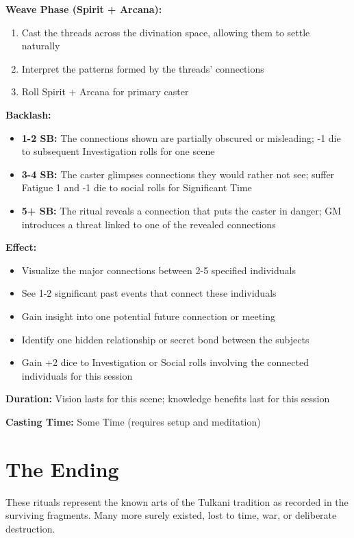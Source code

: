 \textbf{Weave Phase (Spirit + Arcana):}
\begin{enumerate}
\item Cast the threads across the divination space, allowing them to settle naturally
\item Interpret the patterns formed by the threads' connections
\item Roll Spirit + Arcana for primary caster
\end{enumerate}

\textbf{Backlash:}
\begin{itemize}
\item \textbf{1-2 SB:} The connections shown are partially obscured or misleading; -1 die to subsequent Investigation rolls for one scene
\item \textbf{3-4 SB:} The caster glimpses connections they would rather not see; suffer Fatigue 1 and -1 die to social rolls for Significant Time
\item \textbf{5+ SB:} The ritual reveals a connection that puts the caster in danger; GM introduces a threat linked to one of the revealed connections
\end{itemize}

\textbf{Effect:}
\begin{itemize}
\item Visualize the major connections between 2-5 specified individuals
\item See 1-2 significant past events that connect these individuals
\item Gain insight into one potential future connection or meeting
\item Identify one hidden relationship or secret bond between the subjects \item Gain +2 dice to Investigation or Social rolls involving the connected individuals for this session
\end{itemize}

\textbf{Duration:} Vision lasts for this scene; knowledge benefits last for this session

\textbf{Casting Time:} Some Time (requires setup and meditation)

\section*{The Ending}
These rituals represent the known arts of the Tulkani tradition as recorded in the surviving fragments. Many more surely existed, lost to time, war, or deliberate destruction.

